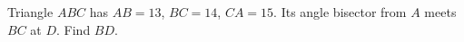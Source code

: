 Triangle $ABC$ has $AB=13$, $BC=14$, $CA=15$. Its angle bisector from $A$ meets $BC$ at $D$. Find $BD$.
